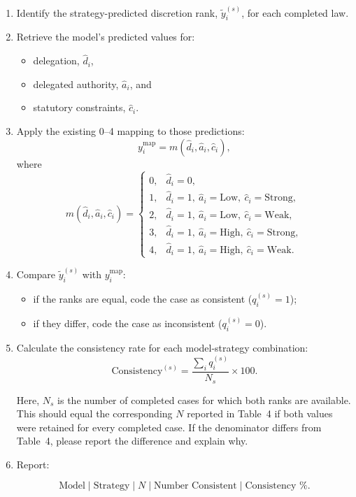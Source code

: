 \documentclass[11pt]{article}
\begin{document}
\begin{enumerate}[leftmargin=*]

    \item Identify the strategy-predicted discretion rank, $\tilde y_i^{(s)}$, for each completed law.

    \item Retrieve the model's predicted values for:
    \begin{itemize}[nosep]
        \item delegation, $\hat d_i$,
        \item delegated authority, $\hat a_i$, and
        \item statutory constraints, $\hat c_i$.
    \end{itemize}

    \item Apply the existing 0--4 mapping to those predictions:
    \[
    y_i^{\mathrm{map}}
    =
    m(\hat d_i,\hat a_i,\hat c_i),
    \]
    where
    \[
    m(\hat d_i,\hat a_i,\hat c_i)=
    \begin{cases}
    0, & \hat d_i=0,\\
    1, & \hat d_i=1,\ \hat a_i=\mathrm{Low},\ \hat c_i=\mathrm{Strong},\\
    2, & \hat d_i=1,\ \hat a_i=\mathrm{Low},\ \hat c_i=\mathrm{Weak},\\
    3, & \hat d_i=1,\ \hat a_i=\mathrm{High},\ \hat c_i=\mathrm{Strong},\\
    4, & \hat d_i=1,\ \hat a_i=\mathrm{High},\ \hat c_i=\mathrm{Weak}.
    \end{cases}
    \]

    \item Compare $\tilde y_i^{(s)}$ with $y_i^{\mathrm{map}}$:
    \begin{itemize}[nosep]
        \item if the ranks are equal, code the case as consistent ($q_i^{(s)}=1$);
        \item if they differ, code the case as inconsistent ($q_i^{(s)}=0$).
    \end{itemize}

    \item Calculate the consistency rate for each model-strategy combination:
    \[
    \mathrm{Consistency}^{(s)}
    =
    \frac{\sum_i q_i^{(s)}}{N_s}
    \times 100.
    \]

    Here, $N_s$ is the number of completed cases for which both ranks are available. This should equal the corresponding $N$ reported in Table~4 if both values were retained for every completed case. If the denominator differs from Table~4, please report the difference and explain why.

    \item Report:
    
    \[
    \text{Model} \;|\; \text{Strategy} \;|\; N
    \;|\; \text{Number Consistent}
    \;|\; \text{Consistency \%}.
    \]

\end{enumerate}
\end{document}
